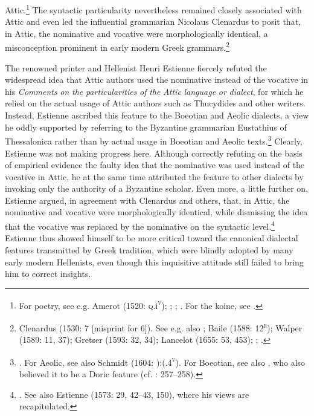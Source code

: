 \documentclass[output=paper]{langsci/langscibook}
\begin{document}
Attic.\footnote{For poetry, see e.g. Amerot (1520: \textsc{q.}i\textsc{\textsuperscript{v}}); \citet[129]{Antesignanus1554}; \citet[34]{Gretser1593}; \citet[157]{Schmidt1604}. For the koine, see \citet[54]{Lancelot1655}.} The syntactic particularity nevertheless remained closely associated with Attic and even led the influential grammarian Nicolaus Clenardus to posit that, in Attic, the nominative and vocative were morphologically identical, a misconception prominent in early modern Greek grammars.\footnote{Clenardus (1530: 7 [misprint for 6]). See e.g. also \citet[534]{Crusius1558}; Baile (1588: 12\textsc{\textsuperscript{r}}); Walper (1589: 11, 37); Gretser (1593: 32, 34); Lancelot (1655: 53, 453); \citet[101]{Giraudeau1739}; \citet[20]{Facius1782}.}

The renowned printer and Hellenist Henri Estienne fiercely refuted the widespread idea that Attic authors used the nominative instead of the vocative in his \textit{Comments} \textit{on} \textit{the} \textit{particularities} \textit{of} \textit{the} \textit{Attic} \textit{language} \textit{or} \textit{dialect}, for which he relied on the actual usage of Attic authors such as Thucydides and other writers. Instead, Estienne ascribed this feature to the Boeotian and Aeolic dialects, a view he oddly supported by referring to the Byzantine grammarian Eustathius of Thessalonica rather than by actual usage in Boeotian and Aeolic texts.\footnote{\citet[15]{Estienne1573}. For Aeolic, see also Schmidt (1604: ):(.4\textsc{\textsuperscript{v}}). For Boeotian, see also \citet[71]{Mérigon1621}, who also believed it to be a Doric feature (cf. \citealt{Maittaire1706}: 257–258).} Clearly, Estienne was not making progress here. Although correctly refuting on the basis of empirical evidence the faulty idea that the nominative was used instead of the vocative in Attic, he at the same time attributed the feature to other dialects by invoking only the authority of a Byzantine scholar. Even more, a little further on, Estienne argued, in agreement with Clenardus and others, that, in Attic, the nominative and vocative were morphologically identical, while dismissing the idea that the vocative was replaced by the nominative on the syntactic level.\footnote{\citet[17]{Estienne1573}. See also Estienne (1573: 29, 42–43, 150), where his views are recapitulated.} Estienne thus showed himself to be more critical toward the canonical dialectal features transmitted by Greek tradition, which were blindly adopted by many early modern Hellenists, even though this inquisitive attitude still failed to bring him to correct insights.
\end{document}
